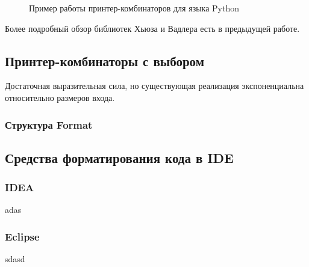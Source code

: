 \begin{figure}[h!]
	\centering
	\null\hfill
	\null\hfill
	\hfill\null
	\caption{Пример работы принтер-комбинаторов для языка Python}
  \label{fig:seqEx}	
\end{figure}



% 


Более подробный обзор библиотек Хьюза и Вадлера есть в предыдущей работе\cite{myCoursePaper}.

\subsection{Принтер-комбинаторы с выбором}
Достаточная выразительная сила, но существующая реализация экспоненциальна
относительно размеров входа.

\subsubsection{Структура Format}

\subsection{Средства форматирования кода в IDE}

\subsubsection{IDEA}
adas
\subsubsection{Eclipse}
sdasd



